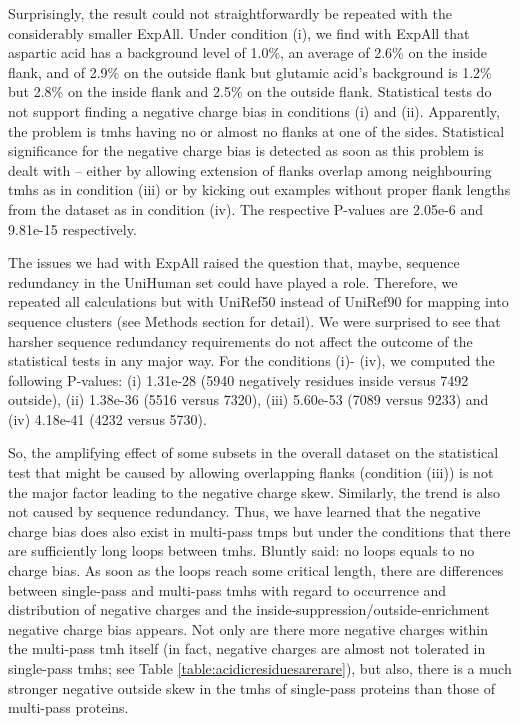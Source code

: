 Surprisingly, the result could not straightforwardly be repeated with the considerably smaller ExpAll.
Under condition (i), we find with ExpAll that aspartic acid has a background level of 1.0\%, an average of 2.6\% on the inside flank, and of 2.9\% on the outside flank but glutamic acid’s background is 1.2\% but 2.8\% on the inside flank and 2.5\% on the outside flank.
Statistical tests do not support finding a negative charge bias in conditions (i) and (ii).
Apparently, the problem is \gls{tmh}s having no or almost no flanks at one of the sides.
Statistical significance for the negative charge bias is detected as soon as this problem is dealt with – either by allowing extension of flanks overlap among neighbouring \gls{tmh}s as in condition (iii) or by kicking out examples without proper flank lengths from the dataset as in condition (iv).
The respective P-values are 2.05e-6 and 9.81e-15 respectively.

The issues we had with ExpAll raised the question that, maybe, sequence redundancy in the UniHuman set could have played a role.
Therefore, we repeated all calculations but with UniRef50 instead of UniRef90 for mapping into sequence clusters (see Methods section for detail).
We were surprised to see that harsher sequence redundancy requirements do not affect the outcome of the statistical tests in any major way.
For the conditions (i)- (iv), we computed the following P-values: (i) 1.31e-28 (5940 negatively residues inside versus 7492 outside), (ii) 1.38e-36 (5516 versus 7320), (iii) 5.60e-53 (7089 versus 9233) and (iv) 4.18e-41 (4232 versus 5730).

So, the amplifying effect of some subsets in the overall dataset on the statistical test that might be caused by allowing overlapping flanks (condition (iii)) is not the major factor leading to the negative charge skew.
Similarly, the trend is also not caused by sequence redundancy.
Thus, we have learned that the negative charge bias does also exist in multi-pass \gls{tmp}s but under the conditions that there are sufficiently long loops between \gls{tmh}s.
Bluntly said: no loops equals to no charge bias.
As soon as the loops reach some critical length, there are differences between single-pass and multi-pass \gls{tmh}s with regard to occurrence and distribution of negative charges and the inside-suppression/outside-enrichment negative charge bias appears.
Not only are there more negative charges within the multi-pass \gls{tmh} itself (in fact, negative charges are almost not tolerated in single-pass \gls{tmh}s; see Table \ref{table:acidicresiduesarerare}), but also, there is a much stronger negative outside skew in the \gls{tmh}s of single-pass proteins than those of multi-pass proteins.

